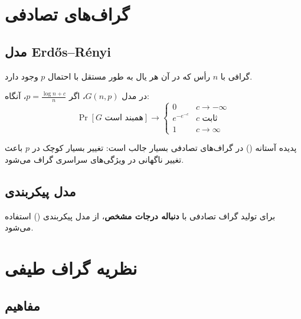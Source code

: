 \documentclass{matinbook}
\begin{document}
    \section{گراف‌های تصادفی}
    
    \subsection{مدل Erdős–Rényi}
    
    \begin{definition}[مدل $G(n, p)$]
        گرافی با $n$ رأس که در آن
        هر یال به طور مستقل با احتمال $p$
        وجود دارد.
        \label{def:gnp}
    \end{definition}
    
    \begin{theorem}
        در مدل $G(n, p)$، اگر
        $p = \frac{\log n + c}{n}$، آنگاه:
        \[
        \Pr[G \text{ همبند است}] \to
        \begin{cases}
            0 & c \to -\infty \\
            e^{-e^{-c}} & c \text{ ثابت} \\
            1 & c \to \infty
        \end{cases}
        \]
        \label{thm:connectivity-threshold}
    \end{theorem}
    
    \begin{remark}
        پدیده آستانه
        ()
        در گراف‌های تصادفی بسیار جالب است:
        تغییر بسیار کوچک در $p$ باعث
        تغییر ناگهانی در ویژگی‌های سراسری
        گراف می‌شود.
        \label{rem:threshold}
    \end{remark}
    
    \subsection{مدل پیکربندی}
    
    برای تولید گراف تصادفی با
    \textbf{دنباله درجات مشخص}،
    از مدل پیکربندی ()
    استفاده می‌شود.
    
    \section{نظریه گراف طیفی}
    
    \subsection{مفاهیم}
    
\end{document}
